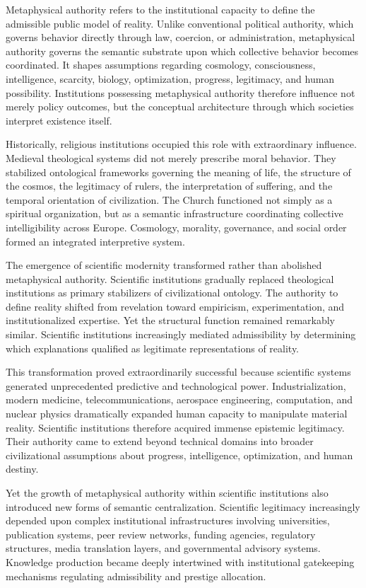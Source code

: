 \documentclass[11pt,a4paper]{article}
\begin{document}
Metaphysical authority refers to the institutional capacity to define the admissible public model of reality. Unlike conventional political authority, which governs behavior directly through law, coercion, or administration, metaphysical authority governs the semantic substrate upon which collective behavior becomes coordinated. It shapes assumptions regarding cosmology, consciousness, intelligence, scarcity, biology, optimization, progress, legitimacy, and human possibility. Institutions possessing metaphysical authority therefore influence not merely policy outcomes, but the conceptual architecture through which societies interpret existence itself.

Historically, religious institutions occupied this role with extraordinary influence. Medieval theological systems did not merely prescribe moral behavior. They stabilized ontological frameworks governing the meaning of life, the structure of the cosmos, the legitimacy of rulers, the interpretation of suffering, and the temporal orientation of civilization. The Church functioned not simply as a spiritual organization, but as a semantic infrastructure coordinating collective intelligibility across Europe. Cosmology, morality, governance, and social order formed an integrated interpretive system.

The emergence of scientific modernity transformed rather than abolished metaphysical authority. Scientific institutions gradually replaced theological institutions as primary stabilizers of civilizational ontology. The authority to define reality shifted from revelation toward empiricism, experimentation, and institutionalized expertise. Yet the structural function remained remarkably similar. Scientific institutions increasingly mediated admissibility by determining which explanations qualified as legitimate representations of reality.

This transformation proved extraordinarily successful because scientific systems generated unprecedented predictive and technological power. Industrialization, modern medicine, telecommunications, aerospace engineering, computation, and nuclear physics dramatically expanded human capacity to manipulate material reality. Scientific institutions therefore acquired immense epistemic legitimacy. Their authority came to extend beyond technical domains into broader civilizational assumptions about progress, intelligence, optimization, and human destiny.

Yet the growth of metaphysical authority within scientific institutions also introduced new forms of semantic centralization. Scientific legitimacy increasingly depended upon complex institutional infrastructures involving universities, publication systems, peer review networks, funding agencies, regulatory structures, media translation layers, and governmental advisory systems. Knowledge production became deeply intertwined with institutional gatekeeping mechanisms regulating admissibility and prestige allocation.
\end{document}
